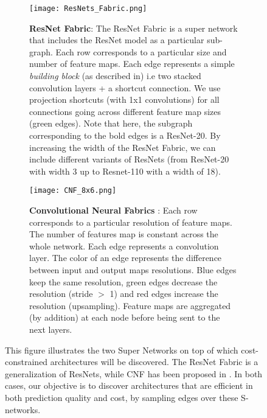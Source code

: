 \documentclass[10pt,twocolumn,letterpaper]{article}
\begin{document}
\begin{figure*}[ht]
\begin{center}
\begin{subfigure}[t]{.49\textwidth} 
	\centering    
    \texttt{[image: ResNets\_Fabric.png]}
    \caption{\textbf{ResNet Fabric}: The ResNet Fabric is a super network that includes the ResNet model as a particular sub-graph. Each row corresponds to a particular size and number of feature maps. Each edge represents a simple \textit{building block} (as described in\cite{DBLP:journals/corr/HeZRS15}) i.e two stacked convolution layers + a shortcut connection. We use projection shortcuts (with 1x1 convolutions) for all connections going across different feature map sizes (green edges). Note that here, the subgraph corresponding to the bold edges is a ResNet-20. By increasing the width of the ResNet Fabric, we can include different variants of ResNets (from ResNet-20 with width 3 up to Resnet-110 with a width of 18). }
	\label{fig1a}
\end{subfigure}
\hfill
\begin{subfigure}[t]{.49\textwidth}
	\centering
	\texttt{[image: CNF\_8x6.png]}         
	\caption{\textbf{Convolutional Neural Fabrics} \cite{DBLP:journals/corr/SaxenaV16}: Each row corresponds to a particular resolution of feature maps. The number of features map is constant across the whole network. Each edge represents a convolution layer. The color of an edge represents the difference between input and output maps resolutions. Blue edges keep the same resolution, green edges decrease the resolution (stride $>$ 1) and red edges increase the resolution (upsampling). Feature maps are aggregated (by addition) at each node before being sent to the next layers. }
	\label{fig1b}
\end{subfigure}

\end{center}
   \caption{This figure illustrates the two Super Networks on top of which cost-constrained architectures will be discovered. The ResNet Fabric is a generalization of ResNets\cite{DBLP:journals/corr/HeZRS15}, while CNF has been proposed in \cite{DBLP:journals/corr/SaxenaV16}. In both cases, our objective is to discover architectures that are efficient in both prediction quality and cost, by sampling edges over these S-networks.}
\label{fig:SuperNetworks}
\label{SuperNetworks_imgs}
\end{figure*}
\end{document}
